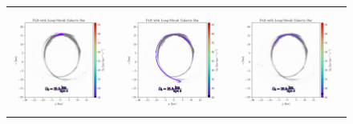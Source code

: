             \begin{figure}
                \centering
                \begin{tabular}{ccc}
                    \includegraphics[width=.32\linewidth]{images/frame_0002.png}&
                    \includegraphics[width=.32\linewidth]{images/frame_0004.png}&
                    \includegraphics[width=.32\linewidth]{images/frame_0008.png}\\
                    

\end{tabular}
\end{figure}

